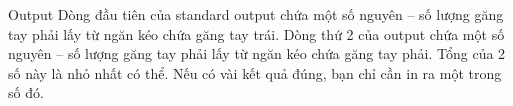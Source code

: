 Output
Dòng đầu tiên của standard output chứa một số nguyên – số lượng găng tay phải lấy từ ngăn kéo chứa găng tay trái. Dòng thứ 2 của output chứa một số nguyên – số lượng găng tay phải lấy từ ngăn kéo chứa găng tay phải. Tổng của 2 số này là nhỏ nhất có thể. Nếu có vài kết quả đúng, bạn chỉ cần in ra một trong số đó.